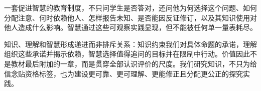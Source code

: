 \begin{argumentbox}
一套促进智慧的教育制度，不只问学生是否答对，还问他为何选择这个问题、如何分配注意、何时依赖他人、怎样报告未知、是否能因反证修订，以及其知识使用对他人造成什么影响。智慧通过这些可观察实践显现，但不能被任何单一量表耗尽。
\end{argumentbox}

知识、理解和智慧形成递进而非排斥关系：知识约束我们对具体命题的承诺，理解组织这些承诺并揭示依赖，智慧选择值得追问的目标并在限制中行动。价值因此不是教材最后附加的一章，而是贯穿全部认识评价的尺度。我们研究知识，不只为给信念贴资格标签，也为建设更可靠、更可理解、更能修正且分配更公正的探究实践。
